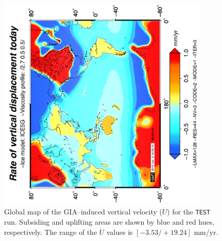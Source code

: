 \documentclass[11pt,fleqn,a4paper,titlepage]{article}
\begin{document}
\begin{figure}[h]
\begin{center}
\includegraphics[width=0.9\textwidth, angle=-90]{./Figures/udotmap.png}
\caption[Vertical velocity fingerprint]{\small{Global map of the GIA--induced vertical velocity ($\dot U$) for the \texttt{TEST} run. Subsiding and uplifting areas are shown by blue and red hues, respectively. 
The range of the $\dot U$ values is $[-3.53/+19.24]$ mm/yr.}}
\label{fig:udot}
\end{center}
\end{figure}
\newpage
\end{document}
